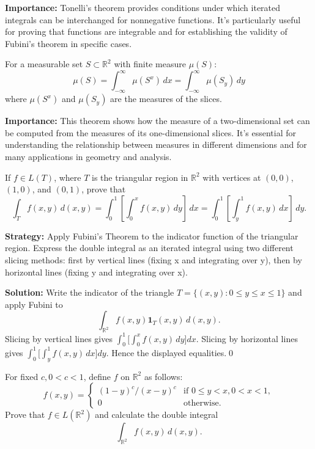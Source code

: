 \noindent\textbf{Importance:} Tonelli's theorem provides conditions under which iterated integrals can be interchanged for nonnegative functions. It's particularly useful for proving that functions are integrable and for establishing the validity of Fubini's theorem in specific cases.



\begin{theorem}
For a measurable set $S \subset \mathbb{R}^2$ with finite measure $\mu(S)$:
\[\mu(S) = \int_{-\infty}^{\infty} \mu(S^x) \, dx = \int_{-\infty}^{\infty} \mu(S_y) \, dy\]
where $\mu(S^x)$ and $\mu(S_y)$ are the measures of the slices.
\end{theorem}

\noindent\textbf{Importance:} This theorem shows how the measure of a two-dimensional set can be computed from the measures of its one-dimensional slices. It's essential for understanding the relationship between measures in different dimensions and for many applications in geometry and analysis.


 


\begin{problembox}
\begin{problemstatement}
If \( f \in L(T) \), where \( T \) is the triangular region in \( \mathbb{R}^2 \) with vertices at \((0, 0)\), \((1, 0)\), and \((0, 1)\), prove that
\[
\int_T f(x, y) \, d(x, y) = \int_0^1 \left[ \int_0^x f(x, y) \, dy \right] \, dx = \int_0^1 \left[ \int_y^1 f(x, y) \, dx \right] \, dy.
\]
\end{problemstatement}
\end{problembox}

\noindent\textbf{Strategy:} Apply Fubini's Theorem to the indicator function of the triangular region. Express the double integral as an iterated integral using two different slicing methods: first by vertical lines (fixing x and integrating over y), then by horizontal lines (fixing y and integrating over x).

\bigskip\noindent\textbf{Solution:}
Write the indicator of the triangle \(T=\{(x,y): 0\le y \le x \le 1\}\) and apply Fubini to
\[
\int_{\mathbb{R}^2} f(x,y) \mathbf{1}_T(x,y)\, d(x,y).
\]
Slicing by vertical lines gives \(\int_0^1\!\big[\int_0^x f(x,y)\,dy\big]dx\). Slicing by horizontal lines gives \(\int_0^1\!\big[\int_y^1 f(x,y)\,dx\big]dy\). Hence the displayed equalities.\qed


\begin{problembox}
\begin{problemstatement}
For fixed \( c, 0 < c < 1 \), define \( f \) on \( \mathbb{R}^2 \) as follows:
\[
f(x, y) = 
\begin{cases} 
(1 - y)^c / (x - y)^c & \text{if } 0 \leq y < x, 0 < x < 1, \\
0 & \text{otherwise}.
\end{cases}
\]
Prove that \( f \in L(\mathbb{R}^2) \) and calculate the double integral 
\[
\int_{\mathbb{R}^2} f(x, y) \, d(x, y).
\]
\end{problemstatement}
\end{problembox}

